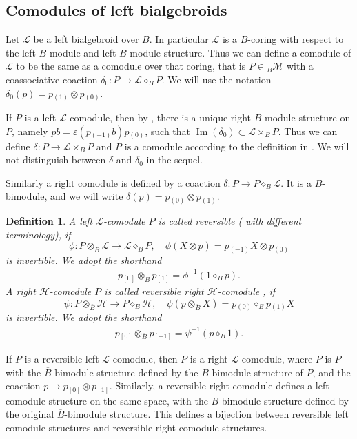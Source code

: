 \documentclass[a4paper,reqno]{amsart}
\numberwithin{equation}{section}
\theoremstyle{plain}
\newtheorem{defi}[thm]{Definition}
\theoremstyle{remark}
\numberwithin{equation}{section}
\newcommand{\ot}{\otimes}
\newcommand\ol{\overline}
\newcommand{\cL}{\mathcal{L}}
\newcommand{\BB}{\overline{B}}
\newcommand{\z}{{}_{\scriptscriptstyle{(0)}}}
\newcommand{\rz}{{}_{\scriptscriptstyle{[0]}}}
\renewcommand{\o}{{}_{\scriptscriptstyle{(1)}}}
\newcommand{\ro}{{}_{\scriptscriptstyle{[1]}}}
\newcommand{\mo}{{}_{\scriptscriptstyle{(-1)}}}
\newcommand{\rmo}{{}_{\scriptscriptstyle{[-1]}}}
\newcommand{\di}{{\diamond_{B}}}
\newcommand{\CH}{\mathcal{H}}
\newcommand{\CL}{\mathcal{L}}
\begin{document}
\subsection{Comodules of left bialgebroids}


Let $\CL$ be a left bialgebroid over $B$. In particular $\CL$ is a $B$-coring with respect to the left $B$-module and left $\ol B$-module structure. Thus we can define a comodule of $\CL$ to be the same as a comodule over that coring, that is $P\in {}_B\mathcal M$ with a coassociative coaction $\delta_0\colon P\to\CL\di P$. We will use the notation $\delta_0(p)=p\o\ot p\z$.

If $P$ is a left $\CL$-comodule, then by \cite{HHP}, there is a unique right $B$-module structure on $P$, namely $pb=\varepsilon(p\mo b)p\z$, such that $\operatorname{Im}(\delta_0)\subset \CL\times_BP$. Thus we can define $\delta\colon P\to\CL\times_BP$ and $P$ is a comodule according to the definition in \cite{schau1}. We will not distinguish between $\delta$ and $\delta_0$ in the sequel.

Similarly a right comodule is defined by a coaction $\delta\colon P\to P\di\CL$. It is a $\BB$-bimodule, and we will write $\delta(p)=p\z\ot p\o$.

\begin{defi}\label{def. regular of comodule}
A left $\cL$-comodule $P$ is called  reversible (\cite{C20} with different terminology), if
\[\phi: P\ot_{B} \cL\to \cL\di P, \quad \phi(X\ot p)=p\mo X\ot p\z\]
is invertible. We adopt the shorthand
\begin{align}
    p\rz\ot_{B} p\ro=\phi^{-1}(1\di p).
\end{align}
A right $\CH$-comodule $P$ is called  reversible right $\CH$-comodule \cite{C20}, if
\[\psi: P\ot_{\BB} \CH\to P\di \CH, \quad \psi(p\ot_{\BB} X)=p\z \di p\o X\]
is invertible. We adopt the shorthand
\begin{align}
    p\rz\ot_{\BB} p\rmo=\psi^{-1}(p \di 1).
\end{align}
\end{defi}

If $P$ is a reversible left $\CL$-comodule, then $\ol P$ is a right $\CL$-comodule, where $\ol P$ is $P$ with the $\BB$-bimodule structure defined by the $B$-bimodule structure of $P$, and the coaction
$p\mapsto p\rz\ot p\ro$. Similarly, a reversible right comodule defines a left comodule structure on the same space, with the $B$-bimodule structure defined by the original $\BB$-bimodule structure.
This defines a bijection between reversible left comodule structures and reversible right comodule structures.
\end{document}

